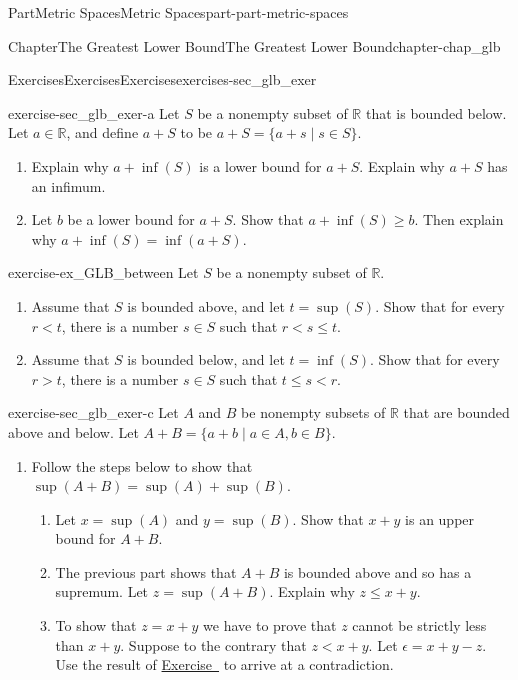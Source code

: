 \documentclass[oneside,10pt,]{book}
\newcommand{\xreffont}{\relax}
\numberwithin{equation}{chapter}
\newcommand{\R}{\mathbb{R}}
\newcommand{\lt}{<}
\newcommand{\gt}{>}
\begin{document}
\begin{partptx}{Part}{Metric Spaces}{}{Metric Spaces}{}{}{part-part-metric-spaces}
\begin{chapterptx}{Chapter}{The Greatest Lower Bound}{}{The Greatest Lower Bound}{}{}{chapter-chap_glb}
\typeout{************************************************}
%
\begin{exercises-section}{Exercises}{Exercises}{}{Exercises}{}{}{exercises-sec_glb_exer}
\begin{divisionexercise}{1}{}{}{exercise-sec_glb_exer-a}%
Let \(S\) be a nonempty subset of \(\R\) that is bounded below. Let \(a \in \R\), and define \(a+S\) to be \(a+S = \{a+s \mid s \in S\}\).%
\begin{enumerate}[font=\bfseries,label=(\alph*),ref=\alph*]%
\item{}Explain why \(a+\inf(S)\) is a lower bound for \(a+S\). Explain why \(a+S\) has an infimum.%
\item{}Let \(b\) be a lower bound for \(a+S\). Show that \(a + \inf(S) \geq b\). Then explain why \(a+\inf(S) = \inf(a+S)\).%
\end{enumerate}%
\end{divisionexercise}%
\begin{divisionexercise}{2}{}{}{exercise-ex_GLB_between}%
Let \(S\) be a nonempty subset of \(\R\).%
\begin{enumerate}[font=\bfseries,label=(\alph*),ref=\alph*]%
\item{}Assume that \(S\) is bounded above, and let \(t = \sup(S)\). Show that for every \(r \lt t\), there is a number \(s \in S\) such that \(r \lt s \leq t\).%
\item{}Assume that \(S\) is bounded below, and let \(t = \inf(S)\). Show that for every \(r \gt t\), there is a number \(s \in S\) such that \(t \leq s \lt r\).%
\end{enumerate}%
\end{divisionexercise}%
\begin{divisionexercise}{3}{}{}{exercise-sec_glb_exer-c}%
Let \(A\) and \(B\) be nonempty subsets of \(\R\) that are bounded above and below. Let \(A+B = \{a+b \mid a \in A, b \in B\}\).%
\begin{enumerate}[font=\bfseries,label=(\alph*),ref=\alph*]%
\item{}Follow the steps below to show that \(\sup(A+B) = \sup(A) + \sup(B)\).%
\begin{enumerate}[font=\bfseries,label=(\roman*),ref=\theenumi.\roman*]%
\item{}Let \(x = \sup(A)\) and \(y = \sup(B)\). Show that \(x+y\) is an upper bound for \(A+B\).%
\item{}The previous part shows that \(A+B\) is bounded above and so has a supremum. Let \(z = \sup(A+B)\). Explain why \(z \leq x+y\).%
\item{}To show that \(z = x+y\) we have to prove that \(z\) cannot be strictly less than \(x+y\). Suppose to the contrary that \(z \lt x+y\). Let \(\epsilon = x+y-z\). Use the result of \hyperlink{exercise-ex_GLB_between}{Exercise~{\xreffont 2}} to arrive at a contradiction.%

\end{enumerate}
\end{enumerate}
\end{divisionexercise}
\end{exercises-section}
\end{chapterptx}
\end{partptx}
\end{document}
